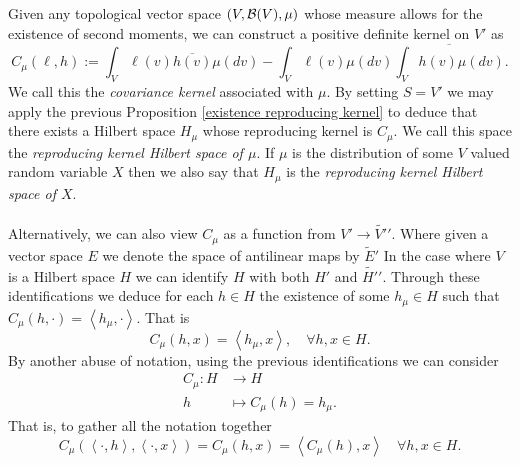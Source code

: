 \documentclass[12pt]{article}
\newcommand{\br}[1]{\left\langle#1\right\rangle}
\begin{document}
Given any topological vector space $(V,\mathcal{B}(V),\mu )$ whose measure allows for the existence of second moments, we can construct a positive definite kernel on $V'$ as
\begin{equation*}
    C_\mu (\ell ,h):=\int_{V}\ell (v) \overline{h(v)}\mu (dv)-\int_{V}\ell (v) \mu (dv)\overline{\int_{V}h(v)\mu (dv)}.
\end{equation*}
We call this the \emph{covariance kernel} associated with $\mu $. By setting $S=V'$ we may apply the previous Proposition \ref{existence reproducing kernel}
to deduce that there exists a Hilbert space $H_\mu $ whose reproducing kernel is $C_\mu $. We call this space the \emph{reproducing kernel Hilbert space of $\mu $}. If $\mu $ is the distribution of some $V$ valued random variable $X$ then we also say that $H_\mu $ is the  \emph{reproducing kernel Hilbert space of $X$}.\\
\\
Alternatively, we can also view  $C_\mu $ as a function from $V'\to \tilde{V'}'$. Where given a vector space $E$ we denote the space of antilinear maps by   $\tilde{E}'$ In the case where $V$ is a Hilbert space $H$ we can identify $H$ with both $H'$ and $\tilde{H'}'$. Through these identifications we deduce for each $h\in H$ the existence of  some $h_\mu \in H$ such that
$C_\mu (h,\cdot )=\br{h_\mu,\cdot  }$. That is
\begin{equation*}
    C_\mu (h,x)=\br{h_\mu,x},\quad\forall h,x \in H .
\end{equation*}
By another abuse of notation, using the previous identifications we can consider
\begin{align*}
    C_\mu : H & \longrightarrow H             \\
    h         & \longmapsto C_\mu (h) = h_\mu
    .\end{align*}
That is, to gather all the notation together
\begin{equation*}
    C_\mu (\br{\cdot ,h},\br{\cdot ,x})=C_\mu (h,x)=\br{C_\mu (h),x}\quad\forall h,x\in H.
\end{equation*}
\end{document}
